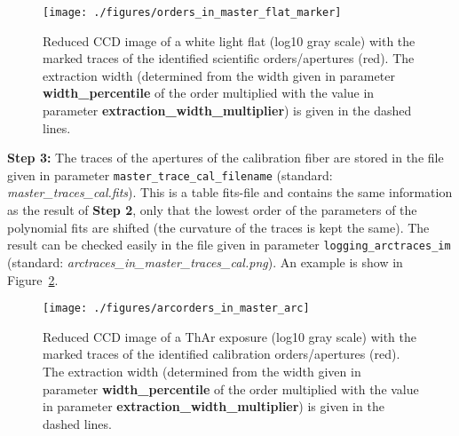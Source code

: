 \documentclass[10pt,a4paper]{article}
\begin{document}
\begin{figure} 
  \begin{center}
    \texttt{[image: ./figures/orders\_in\_master\_flat\_marker]}
  \end{center} 
  \caption{Reduced CCD image of a white light flat (log10 gray scale) with the marked traces of the identified scientific orders/apertures (red). The extraction width (determined from the width given in parameter \textbf{width\_percentile} of the order multiplied with the value in parameter \textbf{extraction\_width\_multiplier}) is given in the dashed lines.
    \label{Fig:apertures_in_master_flat}}
\end{figure}


\vspace{0.5em}\noindent \textbf{Step 3:} The traces of the apertures of the calibration fiber are stored in the file given in parameter \verb|master_trace_cal_filename| (standard: \textit{master\_traces\_cal.fits}). This is a table fits-file and contains the same information as the result of \textbf{Step 2}, only that the lowest order of the parameters of the polynomial fits are shifted (the curvature of the traces is kept the same). The result can be checked easily in the file given in parameter \verb|logging_arctraces_im| (standard: \textit{arctraces\_in\_master\_traces\_cal.png}). An example is show in Figure~\ref{figure_arcapertures_in_master_arc}.

\begin{figure} 
  \begin{center}
    \texttt{[image: ./figures/arcorders\_in\_master\_arc]}
  \end{center} 
  \caption{Reduced CCD image of a ThAr exposure (log10 gray scale) with the marked traces of the identified calibration orders/apertures (red). The extraction width (determined from the width given in parameter \textbf{width\_percentile} of the order multiplied with the value in parameter \textbf{extraction\_width\_multiplier}) is given in the dashed lines.
    \label{figure_arcapertures_in_master_arc}}
\end{figure}
\end{document}

